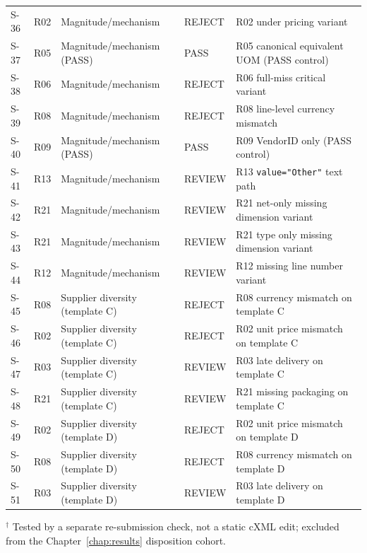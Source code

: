 \begin{longtable}{@{}llllp{6.5cm}@{}}
S-36 & R02 & Magnitude/mechanism        & REJECT & R02 under pricing variant \\
S-37 & R05 & Magnitude/mechanism (PASS) & PASS   & R05 canonical equivalent UOM (PASS control) \\
S-38 & R06 & Magnitude/mechanism        & REJECT & R06 full-miss critical variant \\
S-39 & R08 & Magnitude/mechanism        & REJECT & R08 line-level currency mismatch \\
S-40 & R09 & Magnitude/mechanism (PASS) & PASS   & R09 VendorID only (PASS control) \\
S-41 & R13 & Magnitude/mechanism        & REVIEW & R13 \texttt{value="Other"} text path \\
S-42 & R21 & Magnitude/mechanism        & REVIEW & R21 net-only missing dimension variant \\
S-43 & R21 & Magnitude/mechanism        & REVIEW & R21 type only missing dimension variant \\
S-44 & R12 & Magnitude/mechanism        & REVIEW & R12 missing line number variant \\
\midrule
S-45 & R08 & Supplier diversity (template C)   & REJECT & R08 currency mismatch on template C \\
S-46 & R02 & Supplier diversity (template C)   & REJECT & R02 unit price mismatch on template C \\
S-47 & R03 & Supplier diversity (template C)   & REVIEW & R03 late delivery on template C \\
S-48 & R21 & Supplier diversity (template C)   & REVIEW & R21 missing packaging on template C \\
S-49 & R02 & Supplier diversity (template D) & REJECT & R02 unit price mismatch on template D \\
S-50 & R08 & Supplier diversity (template D) & REJECT & R08 currency mismatch on template D \\
S-51 & R03 & Supplier diversity (template D) & REVIEW & R03 late delivery on template D \\
\end{longtable}
\par\vspace{0.2em}\footnotesize{$^{\dagger}$ Tested by a separate re-submission check, not a static cXML edit; excluded from the Chapter~\ref{chap:results} disposition cohort.}
\normalsize

